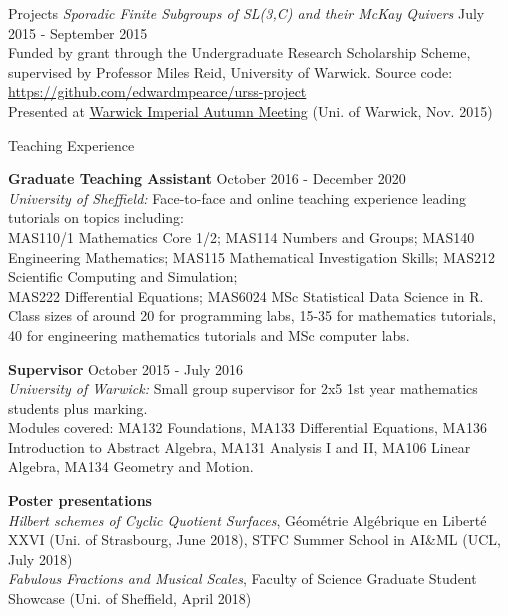 \documentclass{resume} %
\begin{document}
\begin{rSection}{Projects}
{\em Sporadic Finite Subgroups of SL(3,C) and their McKay Quivers} \hfill July 2015 - September 2015 \\
Funded by grant through the Undergraduate Research Scholarship Scheme, supervised by Professor Miles Reid, University of Warwick. 
Source code: \href{https://github.com/edwardmpearce/urss-project}{https://github.com/edwardmpearce/urss-project} \\
Presented at \href{https://warwick.ac.uk/fac/sci/maths/research/events/2015-16/nonsymposium/wimp/}{Warwick Imperial Autumn Meeting} (Uni. of Warwick, Nov. 2015)

\end{rSection}


\begin{rSection}{Teaching Experience}

{\bf Graduate Teaching Assistant} \hfill October 2016 - December 2020 \\
{\em University of Sheffield:} Face-to-face and online teaching experience leading tutorials on topics including: \\
MAS110/1 Mathematics Core 1/2; MAS114 Numbers and Groups; MAS140 Engineering Mathematics; MAS115 Mathematical Investigation Skills; MAS212 Scientific Computing and Simulation; \\
MAS222 Differential Equations; MAS6024 MSc Statistical Data Science in R. \\
Class sizes of around 20 for programming labs, 15-35 for mathematics tutorials, \\40 for engineering mathematics tutorials and MSc computer labs.

{\bf Supervisor} \hfill October 2015 - July 2016 \\
{\em University of Warwick:} Small group supervisor for 2x5 1st year mathematics students plus marking. \\
Modules covered: MA132 Foundations, MA133 Differential Equations, MA136 Introduction to Abstract Algebra, MA131 Analysis I and II, MA106 Linear Algebra, MA134 Geometry and Motion.

{\bf Poster presentations} \\
{\em Hilbert schemes of Cyclic Quotient Surfaces},
Géométrie Algébrique en Liberté XXVI (Uni. of Strasbourg, June 2018), STFC Summer School in AI\&ML (UCL, July 2018) \\
{\em Fabulous Fractions and Musical Scales}, 
Faculty of Science Graduate Student Showcase (Uni. of Sheffield, April 2018)

\end{rSection}
\end{document}
